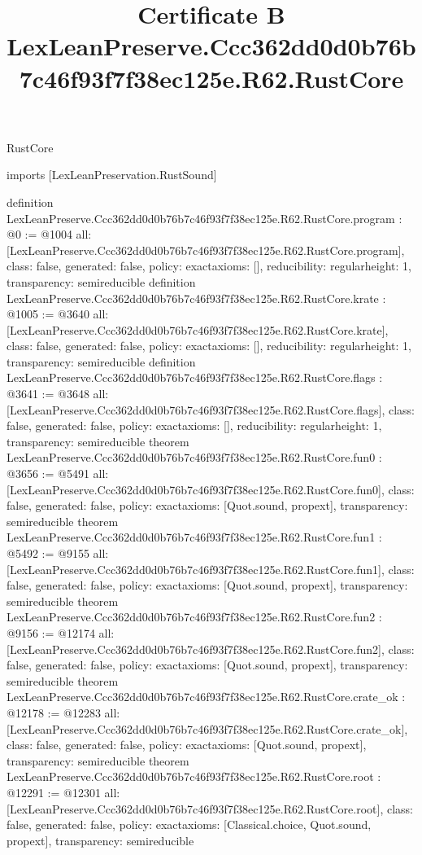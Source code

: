 \begin{lexlean}{RustCore}
\title{Certificate B LexLeanPreserve.Ccc362dd0d0b76b7c46f93f7f38ec125e.R62.RustCore}
\begin{coremodule}
imports [LexLeanPreservation.RustSound]

definition LexLeanPreserve.Ccc362dd0d0b76b7c46f93f7f38ec125e.R62.RustCore.program : @0 := @1004 {
  all: [LexLeanPreserve.Ccc362dd0d0b76b7c46f93f7f38ec125e.R62.RustCore.program],
  class: false,
  generated: false,
  policy: exact{axioms: []},
  reducibility: regular{height: 1},
  transparency: semireducible
}
definition LexLeanPreserve.Ccc362dd0d0b76b7c46f93f7f38ec125e.R62.RustCore.krate : @1005 := @3640 {
  all: [LexLeanPreserve.Ccc362dd0d0b76b7c46f93f7f38ec125e.R62.RustCore.krate],
  class: false,
  generated: false,
  policy: exact{axioms: []},
  reducibility: regular{height: 1},
  transparency: semireducible
}
definition LexLeanPreserve.Ccc362dd0d0b76b7c46f93f7f38ec125e.R62.RustCore.flags : @3641 := @3648 {
  all: [LexLeanPreserve.Ccc362dd0d0b76b7c46f93f7f38ec125e.R62.RustCore.flags],
  class: false,
  generated: false,
  policy: exact{axioms: []},
  reducibility: regular{height: 1},
  transparency: semireducible
}
theorem LexLeanPreserve.Ccc362dd0d0b76b7c46f93f7f38ec125e.R62.RustCore.fun0 : @3656 := @5491 {
  all: [LexLeanPreserve.Ccc362dd0d0b76b7c46f93f7f38ec125e.R62.RustCore.fun0],
  class: false,
  generated: false,
  policy: exact{axioms: [Quot.sound, propext]},
  transparency: semireducible
}
theorem LexLeanPreserve.Ccc362dd0d0b76b7c46f93f7f38ec125e.R62.RustCore.fun1 : @5492 := @9155 {
  all: [LexLeanPreserve.Ccc362dd0d0b76b7c46f93f7f38ec125e.R62.RustCore.fun1],
  class: false,
  generated: false,
  policy: exact{axioms: [Quot.sound, propext]},
  transparency: semireducible
}
theorem LexLeanPreserve.Ccc362dd0d0b76b7c46f93f7f38ec125e.R62.RustCore.fun2 : @9156 := @12174 {
  all: [LexLeanPreserve.Ccc362dd0d0b76b7c46f93f7f38ec125e.R62.RustCore.fun2],
  class: false,
  generated: false,
  policy: exact{axioms: [Quot.sound, propext]},
  transparency: semireducible
}
theorem LexLeanPreserve.Ccc362dd0d0b76b7c46f93f7f38ec125e.R62.RustCore.crate_ok : @12178 := @12283 {
  all: [LexLeanPreserve.Ccc362dd0d0b76b7c46f93f7f38ec125e.R62.RustCore.crate_ok],
  class: false,
  generated: false,
  policy: exact{axioms: [Quot.sound, propext]},
  transparency: semireducible
}
theorem LexLeanPreserve.Ccc362dd0d0b76b7c46f93f7f38ec125e.R62.RustCore.root : @12291 := @12301 {
  all: [LexLeanPreserve.Ccc362dd0d0b76b7c46f93f7f38ec125e.R62.RustCore.root],
  class: false,
  generated: false,
  policy: exact{axioms: [Classical.choice, Quot.sound, propext]},
  transparency: semireducible
}


\end{coremodule}
\end{lexlean}
